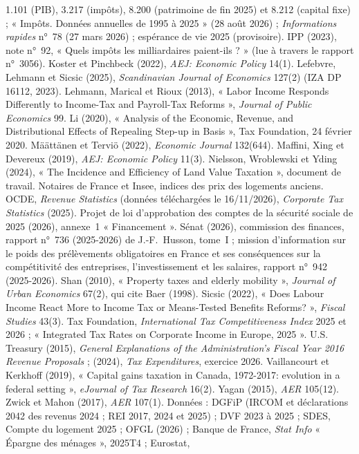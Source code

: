 {1.101 (PIB), 3.217 (impôts), 8.200 (patrimoine de fin 2025) et 8.212 (capital fixe) ; « Impôts. Données annuelles de
1995 à 2025 » (28 août 2026) ; \emph{Informations rapides} n°~78 (27 mars 2026) ; espérance de vie 2025 (provisoire).
IPP (2023), note n°~92, « Quels impôts les milliardaires paient-ils ? » (lue à travers le rapport n°~3056).
Koster et Pinchbeck (2022), \emph{AEJ: Economic Policy} 14(1).
Lefebvre, Lehmann et Sicsic (2025), \emph{Scandinavian Journal of Economics} 127(2) (IZA DP 16112, 2023).
Lehmann, Marical et Rioux (2013), « Labor Income Responds Differently to Income-Tax and Payroll-Tax Reforms »,
\emph{Journal of Public Economics} 99.
Li (2020), « Analysis of the Economic, Revenue, and Distributional Effects of Repealing Step-up in Basis », Tax
Foundation, 24 février 2020.
Määttänen et Terviö (2022), \emph{Economic Journal} 132(644).
Maffini, Xing et Devereux (2019), \emph{AEJ: Economic Policy} 11(3).
Nielsson, Wroblewski et Yding (2024), « The Incidence and Efficiency of Land Value Taxation », document de
travail.
Notaires de France et Insee, indices des prix des logements anciens.
OCDE, \emph{Revenue Statistics} (données téléchargées le 16/11/2026), \emph{Corporate Tax Statistics} (2025).
Projet de loi d'approbation des comptes de la sécurité sociale de 2025 (2026), annexe~1 « Financement ».
Sénat (2026), commission des finances, rapport n°~736 (2025-2026) de J.-F.~Husson, tome~I ; mission d'information sur le poids des prélèvements obligatoires en France et ses conséquences sur
la compétitivité des entreprises, l'investissement et les salaires, rapport n°~942 (2025-2026).
Shan (2010), « Property taxes and elderly mobility », \emph{Journal of Urban Economics} 67(2), qui cite Baer (1998).
Sicsic (2022), « Does Labour Income React More to Income Tax or Means-Tested Benefits Reforms? », \emph{Fiscal
Studies} 43(3).
Tax Foundation, \emph{International Tax Competitiveness Index} 2025 et 2026 ; « Integrated Tax Rates on Corporate
Income in Europe, 2025 ».
U.S. Treasury (2015), \emph{General Explanations of the Administration's Fiscal Year 2016 Revenue Proposals} ; (2024),
\emph{Tax Expenditures}, exercice 2026.
Vaillancourt et Kerkhoff (2019), « Capital gains taxation in Canada, 1972-2017: evolution in a federal setting »,
\emph{eJournal of Tax Research} 16(2).
Yagan (2015), \emph{AER} 105(12).
Zwick et Mahon (2017), \emph{AER} 107(1).
Données : DGFiP (IRCOM et déclarations 2042 des revenus 2024 ; REI 2017, 2024 et 2025) ; DVF 2023 à 2025 ; SDES,
Compte du logement 2025 ; OFGL (2026) ; Banque de France, \emph{Stat Info} « Épargne des ménages », 2025T4 ; Eurostat,
}
